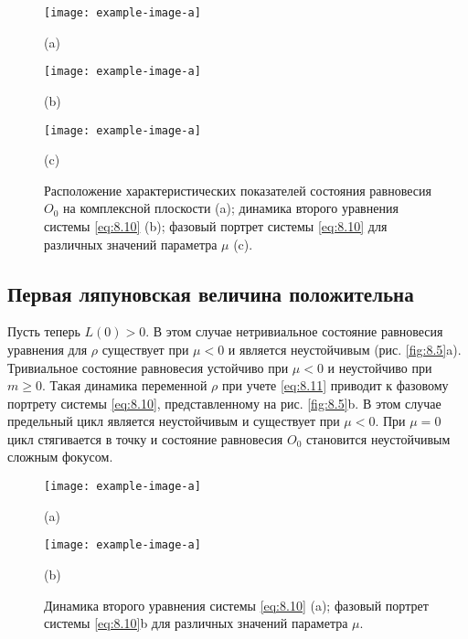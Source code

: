 \begin{figure}[h]
        \centering
        \begin{minipage}{0.25\textheight}
            \centering
            \texttt{[image: example-image-a]} 

            (a)
        \end{minipage}
        \vfill
        \begin{minipage}{0.25\textheight}
            \centering
            \texttt{[image: example-image-a]} 

            (b)
        \end{minipage}
        \vfill
        \begin{minipage}{0.25\textheight}
            \centering
            \texttt{[image: example-image-a]} 

            (c)
        \end{minipage}
        \caption{Расположение характеристических показателей состояния равновесия
        $O_0$ на комплексной плоскости (a); динамика второго уравнения системы
\eqref{eq:8.10} (b); фазовый портрет системы \eqref{eq:8.10} для различных значений параметра $\mu$ (c).}
        \label{fig:8.4}
\end{figure}

\subsection{Первая ляпуновская величина положительна}%
\label{sub:8.3.2}

Пусть теперь $L(0)>0$. В этом случае нетривиальное состояние равновесия
уравнения для $\rho$ существует при $\mu<0$ и является неустойчивым (рис. \ref{fig:8.5}a).
Тривиальное состояние равновесия устойчиво при $\mu<0$ и неустойчиво при $m\geq 0$.
Такая динамика переменной $\rho$ при учете \eqref{eq:8.11} приводит к фазовому портрету
системы \eqref{eq:8.10}, представленному на рис. \ref{fig:8.5}b. В этом случае предельный цикл
является неустойчивым и существует при $\mu<0$. При $\mu=0$ цикл стягивается в
точку и состояние равновесия $O_0$ становится неустойчивым сложным фокусом.

\begin{figure}[h]
        \centering
        \begin{minipage}{0.25\textheight}
            \centering
            \texttt{[image: example-image-a]} 

            (a)
        \end{minipage}
        \vfill
        \begin{minipage}{0.25\textheight}
            \centering
            \texttt{[image: example-image-a]} 

            (b)
        \end{minipage}
        \caption{Динамика второго уравнения системы \eqref{eq:8.10} (a); фазовый портрет системы
        \eqref{eq:8.10}b для различных значений параметра $\mu$.}
        \label{fig:8.4}
\end{figure}

